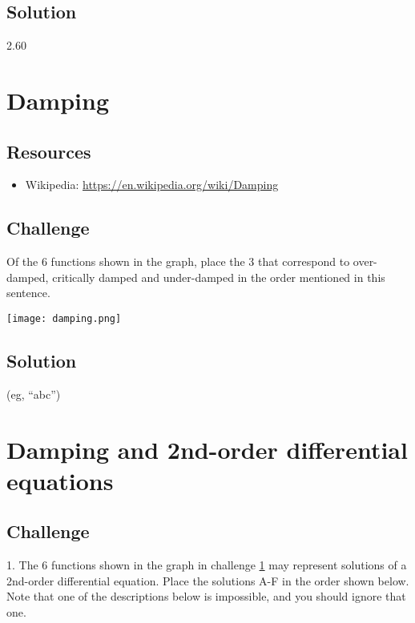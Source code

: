 \subsection*{Solution}
2.60

\timebox




\newpage
\section{Damping}
\label{sec:damping}

\subsection*{Resources}
\begin{itemize}
    \item Wikipedia: \url{https://en.wikipedia.org/wiki/Damping}
\end{itemize}

\subsection*{Challenge}
Of the 6 functions shown in the graph, place the 3 that correspond to over-damped, critically damped and under-damped in the order mentioned in this sentence.

\texttt{[image: damping.png]}

\subsection*{Solution}
(eg, ``abc'')


\timebox



\newpage
\section{Damping and 2nd-order differential equations}

\subsection*{Challenge}
1. The 6 functions shown in the graph in challenge \ref{sec:damping} may represent solutions of a 2nd-order differential equation. Place the solutions A-F in the order shown below. Note that one of the descriptions below is impossible, and you should ignore that one.

